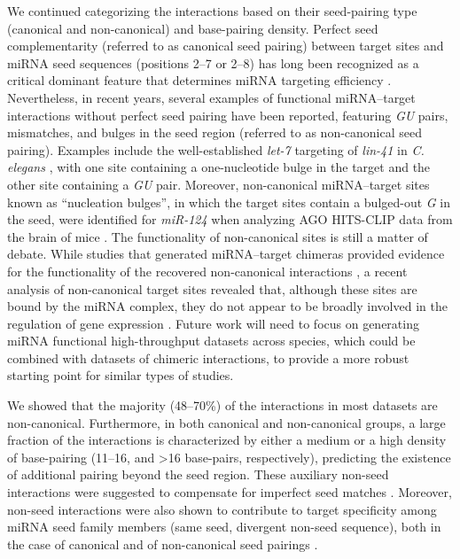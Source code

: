 \documentclass{bmcart}
\begin{document}
We continued categorizing the interactions based on their seed-pairing type (canonical and non-canonical) and base-pairing density. Perfect seed complementarity (referred to as canonical seed pairing) between target sites and miRNA seed sequences (positions 2--7 or 2--8) has long been recognized as a critical dominant feature that determines miRNA targeting efficiency \cite{bartel2009micrornas, lewis2005conserved, schirle2014structural}. Nevertheless, in recent years, several examples of functional miRNA--target interactions without perfect seed pairing have been reported, featuring \textit{GU} pairs, mismatches, and bulges in the seed region (referred to as non-canonical seed pairing). Examples include the well-established \textit{let-7} targeting of \textit{lin-41} in \textit{C. elegans} \cite{slack2000lin, vella2004c}, with one site containing a one-nucleotide bulge in the target and the other site containing a \textit{GU} pair. Moreover, non-canonical miRNA--target sites known as “nucleation bulges”, in which the target sites contain a bulged-out \textit{G} in the seed, were identified for \textit{miR-124} when analyzing AGO HITS-CLIP data from the brain of mice \cite{chi2012alternative}. The functionality of non-canonical sites is still a matter of debate. While studies that generated miRNA--target chimeras provided evidence for the functionality of the recovered non-canonical interactions \cite{helwak2013mapping,grosswendt2014unambiguous}, a recent analysis of non-canonical target sites revealed that, although these sites are bound by the miRNA complex, they do not appear to be broadly involved in the regulation of gene expression \cite{agarwal2015predicting}. Future work will need to focus on generating miRNA functional high-throughput datasets \cite{soriano2019functional} across species, which could be combined with datasets of chimeric interactions, to provide a more robust starting point for similar types of studies.


We showed that the majority (48--70\%) of the interactions in most datasets are non-canonical. Furthermore, in both canonical and non-canonical groups, a large fraction of the interactions is characterized by either a medium or a high density of base-pairing (11--16, and \textgreater 16 base-pairs, respectively), predicting the existence of additional pairing beyond the seed region. These auxiliary non-seed interactions were suggested to compensate for imperfect seed matches \cite{brennecke2005principles, grimson2007microrna}. Moreover, non-seed interactions were also shown to contribute to target specificity among miRNA seed family members (same seed, divergent non-seed sequence), both in the case of canonical and of non-canonical seed pairings \cite{broughton2016pairing, darnell_moore2015mirna}.
\end{document}
